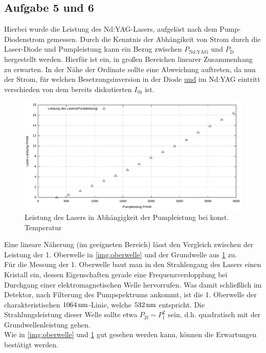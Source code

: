 \documentclass[numbers=noenddot,12pt,a4paper]{scrartcl}
\newcommand{\ix}[1]{_\text{#1}}
\begin{document}
\subsection{Aufgabe 5 und 6}
Hierbei wurde die Leistung des Nd:YAG-Lasers, aufgelöst nach dem Pump-Diodenstrom gemessen. Durch die Kenntnis der Abhängikeit von Strom durch die Laser-Diode und Pumpleistung kann ein Bezug zwischen $P\ix{Nd:YAG}$ und $P\ix{D}$ hergestellt werden. Hierfür ist ein, in großen Bereichen linearer Zusammenhang zu erwarten. In der Nähe der Ordinate sollte eine Abweichung auftreten, da nun der Strom, für welchen Besetzungsinversion in der Diode \underline{und} im Nd:YAG eintritt verschieden von dem bereits diskutierten $I\ix{th}$ ist.
\begin{figure}[H]
	\centering
	\includegraphics[width=\textwidth]{messwerte/laserleistung.pdf}
	\caption{Leistung des Lasers in Abhängigkeit der Pumpleistung bei konst. Temperatur}\label{img:grundwelle}
\end{figure}
Eine lineare Näherung (im geeigneten Bereich) lässt den Vergleich zwischen der Leistung der 1. Oberwelle in \ref{img:oberwelle} und der Grundwelle aus \ref{img:grundwelle} zu.\\
Für die Messung der 1. Oberwelle baut man in den Strahlengang des Lasers einen Kristall ein, dessen Eigenschaften gerade eine Frequenzverdopplung bei Durchgang einer elektromagnetischen Welle hervorrufen. Was damit schließlich im Detektor, nach Filterung des Pumpspektrums ankommt, ist die 1. Oberwelle der charakteristischen $\unit[1064]{nm}$-Linie, welche $\unit[532]{nm}$ entspricht. Die Strahlungsleistung dieser Welle sollte etwa $P\ix{2f}\sim P\ix{f}^2$ sein, d.h. quadratisch mit der Grundwellenleistung gehen.\\
Wie in \ref{img:oberwelle} und \ref{img:grundwelle} gut gesehen werden kann, können die Erwartungen bestätigt werden.
\end{document}
